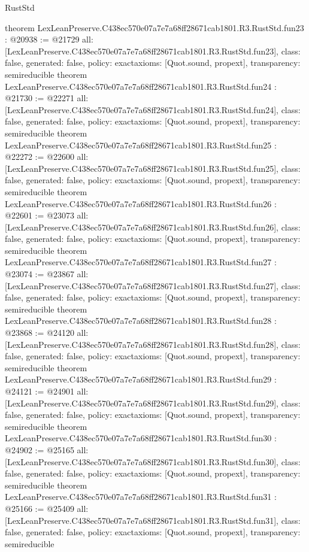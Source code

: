 \begin{lexlean}{RustStd}
\begin{coremodule}
{}
theorem LexLeanPreserve.C438ec570e07a7e7a68ff28671cab1801.R3.RustStd.fun23 : @20938 := @21729 {
  all: [LexLeanPreserve.C438ec570e07a7e7a68ff28671cab1801.R3.RustStd.fun23],
  class: false,
  generated: false,
  policy: exact{axioms: [Quot.sound, propext]},
  transparency: semireducible
}
theorem LexLeanPreserve.C438ec570e07a7e7a68ff28671cab1801.R3.RustStd.fun24 : @21730 := @22271 {
  all: [LexLeanPreserve.C438ec570e07a7e7a68ff28671cab1801.R3.RustStd.fun24],
  class: false,
  generated: false,
  policy: exact{axioms: [Quot.sound, propext]},
  transparency: semireducible
}
theorem LexLeanPreserve.C438ec570e07a7e7a68ff28671cab1801.R3.RustStd.fun25 : @22272 := @22600 {
  all: [LexLeanPreserve.C438ec570e07a7e7a68ff28671cab1801.R3.RustStd.fun25],
  class: false,
  generated: false,
  policy: exact{axioms: [Quot.sound, propext]},
  transparency: semireducible
}
theorem LexLeanPreserve.C438ec570e07a7e7a68ff28671cab1801.R3.RustStd.fun26 : @22601 := @23073 {
  all: [LexLeanPreserve.C438ec570e07a7e7a68ff28671cab1801.R3.RustStd.fun26],
  class: false,
  generated: false,
  policy: exact{axioms: [Quot.sound, propext]},
  transparency: semireducible
}
theorem LexLeanPreserve.C438ec570e07a7e7a68ff28671cab1801.R3.RustStd.fun27 : @23074 := @23867 {
  all: [LexLeanPreserve.C438ec570e07a7e7a68ff28671cab1801.R3.RustStd.fun27],
  class: false,
  generated: false,
  policy: exact{axioms: [Quot.sound, propext]},
  transparency: semireducible
}
theorem LexLeanPreserve.C438ec570e07a7e7a68ff28671cab1801.R3.RustStd.fun28 : @23868 := @24120 {
  all: [LexLeanPreserve.C438ec570e07a7e7a68ff28671cab1801.R3.RustStd.fun28],
  class: false,
  generated: false,
  policy: exact{axioms: [Quot.sound, propext]},
  transparency: semireducible
}
theorem LexLeanPreserve.C438ec570e07a7e7a68ff28671cab1801.R3.RustStd.fun29 : @24121 := @24901 {
  all: [LexLeanPreserve.C438ec570e07a7e7a68ff28671cab1801.R3.RustStd.fun29],
  class: false,
  generated: false,
  policy: exact{axioms: [Quot.sound, propext]},
  transparency: semireducible
}
theorem LexLeanPreserve.C438ec570e07a7e7a68ff28671cab1801.R3.RustStd.fun30 : @24902 := @25165 {
  all: [LexLeanPreserve.C438ec570e07a7e7a68ff28671cab1801.R3.RustStd.fun30],
  class: false,
  generated: false,
  policy: exact{axioms: [Quot.sound, propext]},
  transparency: semireducible
}
theorem LexLeanPreserve.C438ec570e07a7e7a68ff28671cab1801.R3.RustStd.fun31 : @25166 := @25409 {
  all: [LexLeanPreserve.C438ec570e07a7e7a68ff28671cab1801.R3.RustStd.fun31],
  class: false,
  generated: false,
  policy: exact{axioms: [Quot.sound, propext]},
  transparency: semireducible
}
\end{coremodule}
\end{lexlean}
